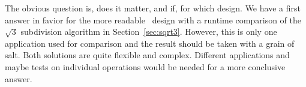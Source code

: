 The obvious question is, does it matter, and if, for which design. We
have a first answer in favior for the more readable \cgal\ design with
a runtime comparison of the $\sqrt{3}$ subdivision algorithm in
Section~\ref{sec:sqrt3}. However, this is only one application used
for comparison and the result should be taken with a grain of salt.
Both solutions are quite flexible and complex. Different applications
and maybe tests on individual operations would be needed for a more
conclusive answer. 

















